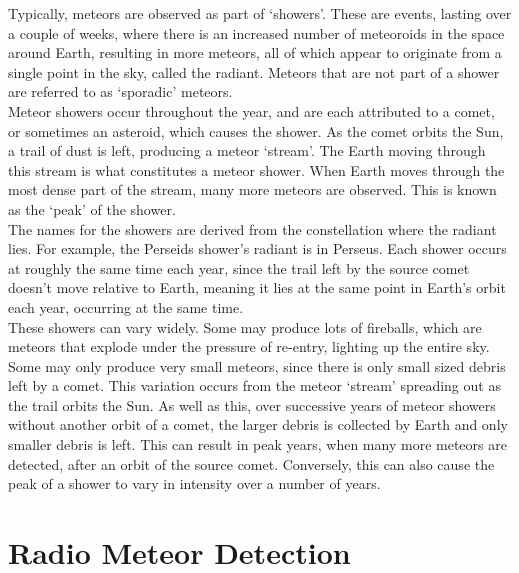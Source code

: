 \documentclass[12pt]{article}
\begin{document}
\large{
Typically, meteors are observed as part of `showers'. These are events, lasting
over a couple of weeks, where there is an increased number of meteoroids in the
space around Earth, resulting in more meteors, all of which appear to originate
from a single point in the sky, called the radiant. Meteors that are not part of
a shower are referred to as `sporadic' meteors.\\

Meteor showers occur throughout the year, and are each attributed to a comet, or
sometimes an asteroid, which causes the shower. As the comet orbits the Sun, a
trail of dust is left, producing a meteor `stream'. The Earth moving through
this stream is what constitutes a meteor shower. When Earth moves through the
most dense part of the stream, many more meteors are observed. This is known as
the `peak' of the shower.\\

The names for the showers are derived from the constellation where the radiant
lies. For example, the Perseids shower's radiant is in Perseus. Each shower
occurs at roughly the same time each year, since the trail left by the source
comet doesn't move relative to Earth, meaning it lies at the same point in
Earth's orbit each year, occurring at the same time. \\

These showers can vary widely. Some may produce lots of fireballs, which are
meteors that explode under the pressure of re-entry, lighting up the entire sky.
Some may only produce very small meteors, since there is only small sized debris
left by a comet. This variation occurs from the meteor `stream' spreading out as
the trail orbits the Sun. As well as this, over successive years of meteor
showers without another orbit of a comet, the larger debris is collected by
Earth and only smaller debris is left. This can result in peak years, when many
more meteors are detected, after an orbit of the source comet. Conversely, this
can also cause the peak of a shower to vary in intensity over a number of years.
}

\section{Radio Meteor Detection}
\end{document}
